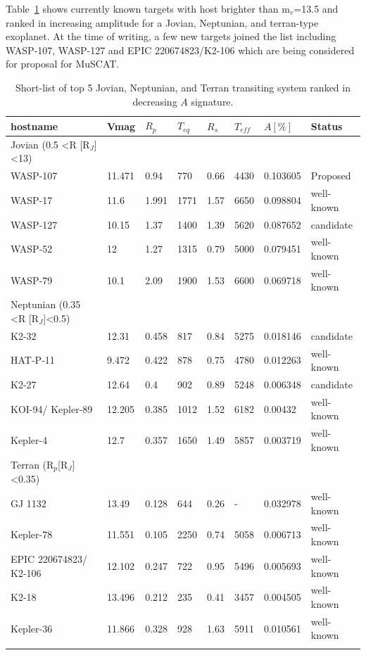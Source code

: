 Table~\ref{tab:A} shows currently known targets with host brighter than m$_v$=13.5 and ranked in increasing amplitude for a Jovian, Neptunian, and terran-type exoplanet. At the time of writing, a few new targets joined the list including WASP-107, WASP-127 and EPIC 220674823/K2-106 which are being considered for proposal for MuSCAT. 

\begin{table}
\centering
\caption{Short-list of top 5 Jovian, Neptunian, and Terran transiting system ranked in decreasing $A$ signature.} 
\begin{tabular}{llllllll}
hostname	&	Vmag	&	$R_p$	&	$T_{eq}$	&	$R_s$	&	$T_{eff}$	&	$A [\%]$& Status	\\ 
\hline
Jovian (0.5 <R [R$_J$]<13)\\
\hline 
WASP-107	&	11.471	&	0.94	&	770	&	0.66	&	4430	&	0.103605	 & Proposed\\
WASP-17	&	11.6	&	1.991	&	1771	&	1.57	&	6650	&	0.098804	&  well-known\\
WASP-127	&	10.15	&	1.37	&	1400	&	1.39	&	5620	&	0.087652	& candidate \\
WASP-52	&	12	&	1.27	&	1315	&	0.79	&	5000	&	0.079451	& well-known \\
WASP-79	&	10.1	&	2.09	&	1900	&	1.53	&	6600	&	0.069718	& well-known \\ 
\hline
Neptunian	(0.35 <R [R$_J$]<0.5)	\\
\hline
K2-32	&	12.31	&	0.458	&	817	&	0.84	&	5275	&	0.018146	& candidate \\
HAT-P-11	&	9.472	&	0.422	&	878	&	0.75	&	4780	&	0.012263	& well-known \\
K2-27	&	12.64	&	0.4	&	902	&	0.89	&	5248	&	0.006348	& candidate \\
KOI-94/ Kepler-89	&	12.205	&	0.385	&	1012	&	1.52	&	6182	&	0.00432	& well-known \\
Kepler-4	&	12.7	&	0.357	&	1650	&	1.49	&	5857	&	0.003719	& well-known\\
\hline
Terran (R$_p$[R$_J$]<0.35) \\
\hline
GJ 1132	&	13.49	&	0.128	&	644	&	0.26	&	-	&	0.032978	& well-known \\
Kepler-78	&	11.551	&	0.105	&	2250	&	0.74	&	5058	&	0.006713	& well-known \\
EPIC 220674823/ K2-106	&	12.102	&	0.247	&	722	&	0.95	&	5496	&	0.005693	& well-known\\
K2-18	&	13.496	&	0.212	&	235	&	0.41	&	3457	&	0.004505	& well-known \\
Kepler-36	&	11.866	&	0.328	&	928	&	1.63	&	5911	&	0.010561	& well-known\\
\hline
\label{tab:A}
\end{tabular}
\end{table}

